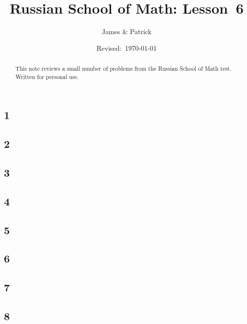 \documentclass[12pt]{article}
\title{Russian School of Math: Lesson~6}
\author{James \& Patrick}
\date{Revised:~\today}
\begin{document}
\maketitle
\begin{abstract}\setlength{\parindent}{0pt}%
This note reviews a small number of problems from the Russian School of Math test. Written for personal use.
\end{abstract}

\thispagestyle{empty}
\clearpage

\subsection*{1}

\begin{solution}
  
\end{solution}

\subsection*{2}

\begin{solution}
  
\end{solution}

\subsection*{3}

\begin{solution}
  
\end{solution}

\subsection*{4}

\begin{solution}
  
\end{solution}

\subsection*{5}

\begin{solution}
  
\end{solution}

\subsection*{6}

\begin{solution}
  
\end{solution}

\subsection*{7}

\begin{solution}
  
\end{solution}

\subsection*{8}

\begin{solution}
  
\end{solution}
\end{document}
